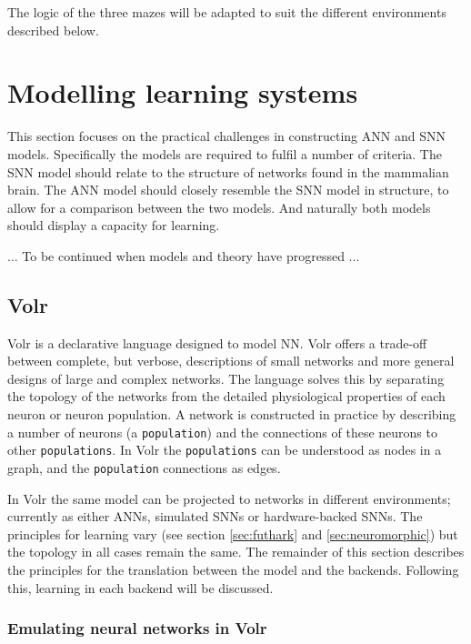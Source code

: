 \documentclass[report.tex]{subfiles}
\begin{document}
The logic of the three mazes will be adapted to suit the different environments described below.

\section{Modelling learning systems} \label{sec:learning}
This section focuses on the practical challenges in constructing ANN and SNN models.
Specifically the models are required to fulfil a number of criteria.
The SNN model should relate to the structure of networks found in the mammalian brain.
The ANN model should closely resemble the SNN model in structure, to allow for a comparison between the two models.
And naturally both models should display a capacity for learning.

... To be continued when models and theory have progressed ...

\subsection{Volr}
Volr is a declarative language designed to model \gls{NN}.
Volr offers a trade-off between complete, but verbose, descriptions of small networks and more general designs of large and complex networks.
The language solves this by separating the topology of the networks from the detailed physiological properties of each neuron or neuron population.
A network is constructed in practice by describing a number of neurons (a \texttt{population}) and the connections of these neurons to other \texttt{populations}.
In Volr the \texttt{populations} can be understood as nodes in a graph, and the \texttt{population} connections as edges.


In Volr the same model can be projected to networks in different environments; currently as either ANNs, simulated SNNs or hardware-backed SNNs.
The principles for learning vary (see section \ref{sec:futhark} and \ref{sec:neuromorphic}) but the topology in all cases remain the same.
The remainder of this section describes the principles for the translation between the model and the backends.
Following this, learning in each backend will be discussed.

\subsubsection{Emulating neural networks in Volr}
\end{document}
